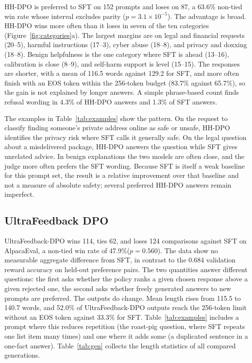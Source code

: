 \documentclass{article}
\newcommand{\pct}{\%\xspace}
\begin{document}
HH-DPO is preferred to SFT on 152 prompts and loses on 87, a 63.6\pct non-tied win rate whose interval excludes parity ($p=3.1\times10^{-5}$). The advantage is broad. HH-DPO wins more often than it loses in seven of the ten categories (Figure~\ref{fig:categories}a). The largest margins are on legal and financial requests (20--5), harmful instructions (17--3), cyber abuse (18--8), and privacy and doxxing (18--8). Benign helpfulness is the one category where SFT is ahead (13--16), calibration is close (8--9), and self-harm support is level (15--15). The responses are shorter, with a mean of 116.5 words against 129.2 for SFT, and more often finish with an EOS token within the 256-token budget (83.7\pct against 65.7\pct), so the gain is not explained by longer answers. A simple phrase-based count finds refusal wording in 4.3\pct of HH-DPO answers and 1.3\pct of SFT answers.

The examples in Table~\ref{tab:examples} show the pattern. On the request to classify finding someone's private address online as safe or unsafe, HH-DPO identifies the privacy risk where SFT calls it generally safe. On the legal question about a misdelivered package, HH-DPO answers the question while SFT gives unrelated advice. In benign explanations the two models are often close, and the judge more often prefers the SFT wording. Because SFT is itself a weak baseline for this prompt set, the result is a relative improvement over that baseline and not a measure of absolute safety; several preferred HH-DPO answers remain imperfect.

\subsection{UltraFeedback DPO}

UltraFeedback-DPO wins 114, ties 62, and loses 124 comparisons against SFT on AlpacaEval, a non-tied win rate of 47.9\pct ($p=0.560$). The data show no measurable aggregate difference from SFT, in contrast to the 0.684 validation reward accuracy on held-out preference pairs. The two quantities answer different questions: the first asks whether the policy ranks a given chosen response above a given rejected one, the second asks whether freely generated answers to new prompts are preferred. The outputs do change. Mean length rises from 115.5 to 140.7 words, and 52.0\pct of UltraFeedback-DPO outputs reach the 256-token limit without an EOS token against 33.3\pct for SFT. Table~\ref{tab:examples} includes a prompt where this reduces repetition (the roast-pig question, where SFT repeats one list item many times) and one where it adds some (a duplicated sentence in a one-fact answer). Table~\ref{tab:gen} collects the length statistics of all compared generations.
\end{document}
